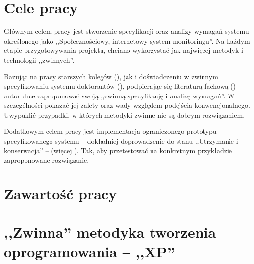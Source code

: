 \newpage

\section{Cele pracy}
\label{sec:celePracy}

Głównym celem pracy jest stworzenie specyfikacji oraz analizy wymagań systemu określonego jako ,,Społecznościowy, internetowy system monitoringu''. Na każdym etapie przygotowywania projektu, chciano wykorzystać jak najwięcej metodyk i technologii ,,zwinnych''.

Bazując na pracy starszych kolegów (\cite{JakMich06}), jak i doświadczeniu w zwinnym specyfikowaniu systemu doktorantów (\cite{Mad09}), podpierając się literaturą fachową (\cite{Bec99}) autor chce zaproponować swoją ,,zwinną specyfikację i analizę wymagań''. W szczególności pokazać jej zalety oraz wady względem podejścia konwencjonalnego. Uwypuklić przypadki, w których metodyki zwinne nie są dobrym rozwiązaniem.

Dodatkowym celem pracy jest implementacja ograniczonego prototypu specyfikowanego systemu -- dokładniej doprowadzenie do stanu ,,Utrzymanie i konserwacja'' -- (więcej ). Tak, aby przetestować na konkretnym przykładzie zaproponowane rozwiązanie.

\section{Zawartość pracy}
\label{sec:zawartoscPracy}

\todo

\newpage

\section{,,Zwinna'' metodyka tworzenia oprogramowania -- ,,XP''}
\label{sec:ZMTO}


